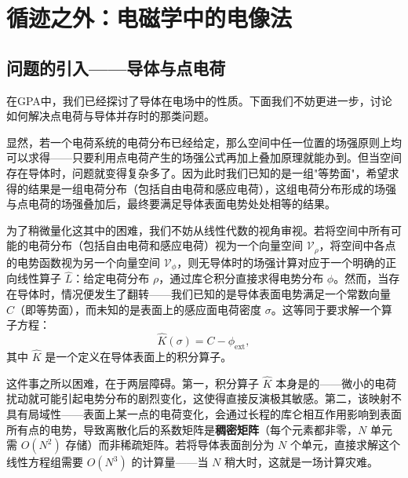 \chapter*{循迹之外：电磁学中的电像法}

\let\oldthesection\thesection
\let\oldthesubsection\thesubsection

\setcounter{section}{0}
\renewcommand{\thesection}{\arabic{section}}
\renewcommand{\thesubsection}{\thesection.\arabic{subsection}}
\setcounter{MgCtr}{0}


\section{问题的引入——导体与点电荷}

在GPA中，我们已经探讨了导体在电场中的性质。下面我们不妨更进一步，讨论如何解决点电荷与导体并存时的那类问题。

显然，若一个电荷系统的电荷分布已经给定，那么空间中任一位置的场强原则上均可以求得——只要利用点电荷产生的场强公式再加上叠加原理就能办到。但当空间存在导体时，问题就变得复杂多了。因为此时我们已知的是一组"等势面"，希望求得的结果是一组电荷分布（包括自由电荷和感应电荷），这组电荷分布形成的场强与点电荷的场强叠加后，最终要满足导体表面电势处处相等的结果。

为了稍微量化这其中的困难，我们不妨从线性代数的视角审视。若将空间中所有可能的电荷分布（包括自由电荷和感应电荷）视为一个向量空间 $\mathcal{V}_{\rho}$，将空间中各点的电势函数视为另一个向量空间 $\mathcal{V}_{\phi}$，则无导体时的场强计算对应于一个明确的正向线性算子 $\hat{L}$：给定电荷分布 $\rho$，通过库仑积分直接求得电势分布 $\phi$。然而，当存在导体时，情况便发生了翻转——我们已知的是导体表面电势满足一个常数向量 $C$（即等势面），而未知的是表面上的感应面电荷密度 $\sigma$。这等同于要求解一个算子方程：
\[\hat{K}(\sigma) = C - \phi_{\text{ext}},\]
其中 $\hat{K}$ 是一个定义在导体表面上的积分算子。

这件事之所以困难，在于两层障碍。第一，积分算子 $\hat{K}$ 本身是的——微小的电荷扰动就可能引起电势分布的剧烈变化，这使得直接反演极其敏感。第二，该映射不具有局域性——表面上某一点的电荷变化，会通过长程的库仑相互作用影响到表面所有点的电势，导致离散化后的系数矩阵是\textbf{稠密矩阵}（每个元素都非零，$N$ 单元需 $O(N^2)$ 存储）而非稀疏矩阵。若将导体表面剖分为 $N$ 个单元，直接求解这个线性方程组需要 $O(N^3)$ 的计算量——当 $N$ 稍大时，这就是一场计算灾难。

